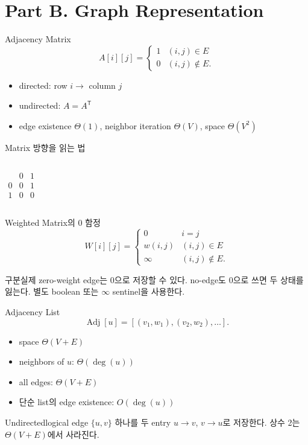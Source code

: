 \section{Part B. Graph Representation}
\begin{frame}{Adjacency Matrix}
\[
A[i][j]=\begin{cases}1&(i,j)\in E\\0&(i,j)\notin E.\end{cases}
\]
\begin{itemize}\item directed: row $i\to$ column $j$\item undirected: $A=A^\mathsf{T}$\item edge existence $\Theta(1)$, neighbor iteration $\Theta(V)$, space $\Theta(V^2)$\end{itemize}
\end{frame}
\begin{frame}{Matrix 방향을 읽는 법}
\begin{columns}[T]
\centering{}
\[
\begin{array}{c|cc}&0&1\\\hline0&0&1\\1&0&0\end{array}
\]
\end{columns}
\end{frame}
\begin{frame}{Weighted Matrix의 0 함정}
\[
W[i][j]=\begin{cases}0&i=j\\w(i,j)&(i,j)\in E\\\infty&(i,j)\notin E.\end{cases}
\]
\begin{alertblock}{구분}실제 zero-weight edge는 $0$으로 저장할 수 있다. no-edge도 $0$으로 쓰면 두 상태를 잃는다. 별도 boolean 또는 \(\infty\) sentinel을 사용한다.\end{alertblock}
\end{frame}
\begin{frame}{Adjacency List}
\[
\operatorname{Adj}[u]=[(v_1,w_1),(v_2,w_2),\ldots].
\]
\begin{itemize}\item space $\Theta(V+E)$\item neighbors of $u$: $\Theta(\deg(u))$\item all edges: $\Theta(V+E)$\item 단순 list의 edge existence: $O(\deg(u))$\end{itemize}
\begin{block}{Undirected}logical edge $\{u,v\}$ 하나를 두 entry $u\to v$, $v\to u$로 저장한다. 상수 2는 $\Theta(V+E)$에서 사라진다.\end{block}
\end{frame}
